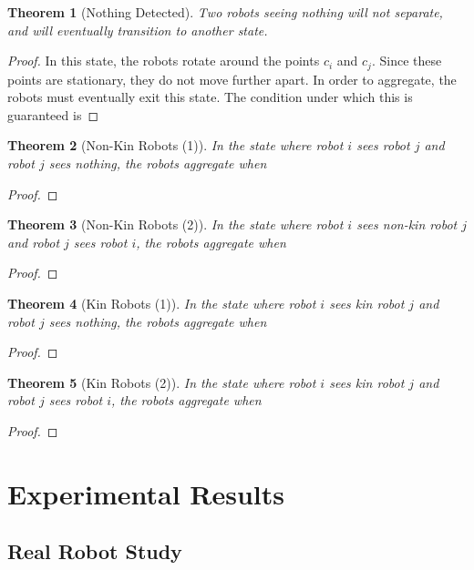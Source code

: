 \documentclass[letterpaper, 10 pt, conference]{ieeeconf}
\newtheorem{theorem}{Theorem}
\begin{document}
  \begin{theorem}[Nothing Detected]
    Two robots seeing nothing will not separate, and will eventually transition to another state.
  \end{theorem}
  \begin{proof}
    In this state, the robots rotate around the points $c_i$ and $c_j$. Since these points are stationary, they do not move further apart. In order to aggregate, the robots must eventually exit this state. The condition under which this is guaranteed is %
  \end{proof}

  \begin{theorem}[Non-Kin Robots (1)]
    In the state where robot $i$ sees robot $j$ and robot $j$ sees nothing, the robots aggregate when %
  \end{theorem}
  \begin{proof}
  \end{proof}

  \begin{theorem}[Non-Kin Robots (2)]
    In the state where robot $i$ sees non-kin robot $j$ and robot $j$ sees robot $i$, the robots aggregate when %
  \end{theorem}
  \begin{proof}
  \end{proof}

  \begin{theorem}[Kin Robots (1)]
    In the state where robot $i$ sees kin robot $j$ and robot $j$ sees nothing, the robots aggregate when %
  \end{theorem}
  \begin{proof}
  \end{proof}

  \begin{theorem}[Kin Robots (2)]
    In the state where robot $i$ sees kin robot $j$ and robot $j$ sees robot $i$, the robots aggregate when %
  \end{theorem}
  \begin{proof}
  \end{proof}

  \section{Experimental Results}

  \subsection{Real Robot Study} \label{section:real_robots}
\end{document}
